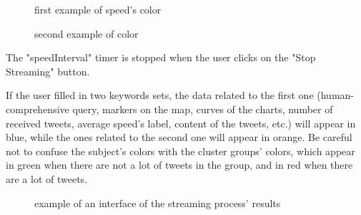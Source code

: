 \documentclass[a4paper,11pt]{report}
\begin{document}
\begin{itemize}
	\begin{figure}[H]
	\centering
	\begin{minipage}{0.45\textwidth}
	\centering
	\vspace{-20pt}
	\caption{first example of speed's color}
	\end{minipage}\hfill
	\begin{minipage}{0.45\textwidth}
	\centering
	\vspace{-20pt}
	\caption{second example of color}
	\end{minipage}
	\end{figure}
\end{itemize}

The "speedInterval" timer is stopped when the user clicks on the "Stop Streaming" button.
\newpage

If the user filled in two keywords sets, the data related to the first one (human-comprehensive query, markers on the map, curves of the charts, number of received tweets, average speed's label, content of the tweets, etc.) will appear in \color{blue}blue\color{black}, while the ones related to the second one will appear in \color{Orange}orange\color{black}. Be careful not to confuse the subject's colors with the cluster groups' colors, which appear in green when there are not a lot of tweets in the group, and in red when there are a lot of tweets.
\begin{figure}[H]
\vspace{-5pt}
\begin{center}
\vspace{-20pt}
\caption{example of an interface of the streaming process' results}
\end{center}
\end{figure}
\vspace{-10pt}
\end{document}
